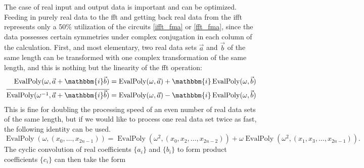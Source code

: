 \documentclass[12 pt]{amsart}
\newcommand{\ii}[0] {\mathbbm{i}}
\begin{document}
The case of real input and output data is important and can be
optimized. Feeding in purely real data to the fft and getting back real data
from the ifft represents only a 50\% utilization of the circuits 
\eqref{ifft_fma} or \eqref{fft_fma}, since the data possesses certain 
symmetries under complex conjugation in each column of the calculation.
First, and most elementary, two real data sets $\vec{a}$ and $\vec{b}$ of the
same length can be transformed with one complex transformation of the same
length, and this is nothing but the linearity of the fft operation:
\begin{align*}
\operatorname{EvalPoly}(\omega, \vec{a} + \ii \vec{b}) = 
\operatorname{EvalPoly}(\omega,\vec{a}) + \ii 
\operatorname{EvalPoly}(\omega,\vec{b})\\
\overline{\operatorname{EvalPoly}(\omega^{-1}, \vec{a} + \ii \vec{b})} = 
\operatorname{EvalPoly}(\omega,\vec{a}) - \ii 
\operatorname{EvalPoly}(\omega,\vec{b})
\end{align*}
This is fine for doubling the processing speed of an even number of real data
sets of the same length, but if we would like to process one real data set
twice as fast, the following identity can be used.
\begin{equation*}
\operatorname{EvalPoly}(\omega, (x_0,\dots,x_{2n-1})) = \operatorname{EvalPoly}(\omega^2, (x_0, x_2,\dots,x_{2n-2})) + \omega \operatorname{EvalPoly}(\omega^2, (x_1, x_3,\dots,x_{2n-1}))\text{.}
\end{equation*}
The cyclic convolution of real coefficients $\{a_i\}$ and $\{b_i\}$ to
form product coefficients $\{c_i\}$ can then take the form
\end{document}
